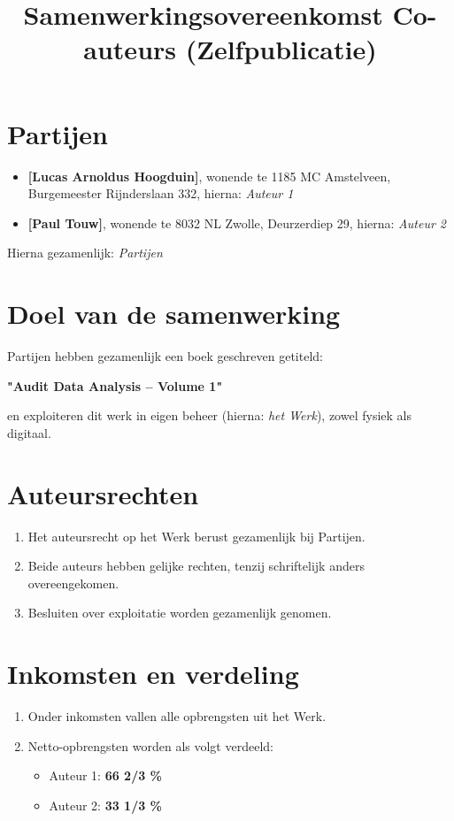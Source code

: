 \documentclass[11pt]{article}
\author{}
\begin{document}
 
\title{Samenwerkingsovereenkomst Co-auteurs (Zelfpublicatie)} 
\date{} 
\maketitle 
\section*{Partijen} 
\begin{itemize} 
    \item \textbf{[Lucas Arnoldus Hoogduin]}, wonende te 1185 MC Amstelveen, Burgemeester Rijnderslaan 332, hierna: \textit{Auteur 1} 
    \item \textbf{[Paul Touw]}, wonende te 8032 NL Zwolle, Deurzerdiep 29, hierna: \textit{Auteur 2} 
\end{itemize} 
Hierna gezamenlijk: \textit{Partijen} 

\section{Doel van de samenwerking} Partijen hebben gezamenlijk een boek geschreven getiteld: 
\begin{center} 
    \textbf{"Audit Data Analysis -- Volume 1"} 
\end{center} 
en exploiteren dit werk in eigen beheer (hierna: \textit{het Werk}), zowel fysiek als digitaal. 

\section{Auteursrechten} 

\begin{enumerate} 
    \item Het auteursrecht op het Werk berust gezamenlijk bij Partijen. 
    \item Beide auteurs hebben gelijke rechten, tenzij schriftelijk anders overeengekomen. 
    \item Besluiten over exploitatie worden gezamenlijk genomen. 
\end{enumerate} 

\section{Inkomsten en verdeling} 

\begin{enumerate} 
    \item Onder inkomsten vallen alle opbrengsten uit het Werk. 
    \item Netto-opbrengsten worden als volgt verdeeld: 
    \begin{itemize} 
        \item Auteur 1: \textbf{66 2/3 \%}
        \item Auteur 2: \textbf{33 1/3 \%}
    \end{itemize} 
\end{enumerate} 
\end{document}
